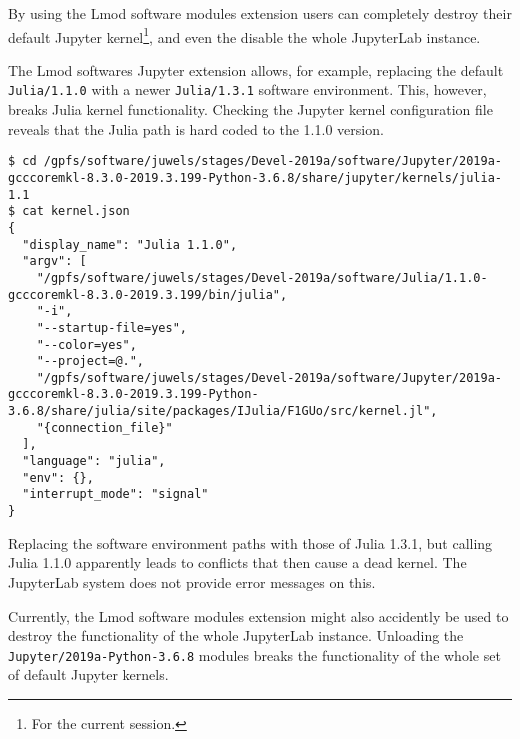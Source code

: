 By using the Lmod software modules extension users can completely destroy their default Jupyter kernel\footnote{For the current session.}, and even the disable the whole JupyterLab instance.

The Lmod softwares Jupyter extension allows, for example, replacing the default \verb|Julia/1.1.0| with a newer \verb|Julia/1.3.1| software environment.
This, however, breaks Julia kernel functionality.
Checking the Jupyter kernel configuration file reveals that the Julia path is hard coded to the 1.1.0 version.
%
\begin{verbatim}
$ cd /gpfs/software/juwels/stages/Devel-2019a/software/Jupyter/2019a-gcccoremkl-8.3.0-2019.3.199-Python-3.6.8/share/jupyter/kernels/julia-1.1
$ cat kernel.json
{
  "display_name": "Julia 1.1.0",
  "argv": [
    "/gpfs/software/juwels/stages/Devel-2019a/software/Julia/1.1.0-gcccoremkl-8.3.0-2019.3.199/bin/julia",
    "-i",
    "--startup-file=yes",
    "--color=yes",
    "--project=@.",
    "/gpfs/software/juwels/stages/Devel-2019a/software/Jupyter/2019a-gcccoremkl-8.3.0-2019.3.199-Python-3.6.8/share/julia/site/packages/IJulia/F1GUo/src/kernel.jl",
    "{connection_file}"
  ],
  "language": "julia",
  "env": {},
  "interrupt_mode": "signal"
}
\end{verbatim}
%
Replacing the software environment paths with those of Julia 1.3.1, but calling Julia 1.1.0 apparently leads to conflicts that then cause a dead kernel.
The JupyterLab system does not provide error messages on this.

Currently, the Lmod software modules extension might also accidently be used to destroy the functionality of the whole JupyterLab instance.
Unloading the \verb|Jupyter/2019a-Python-3.6.8| modules breaks the functionality of the whole set of default Jupyter kernels.

%

